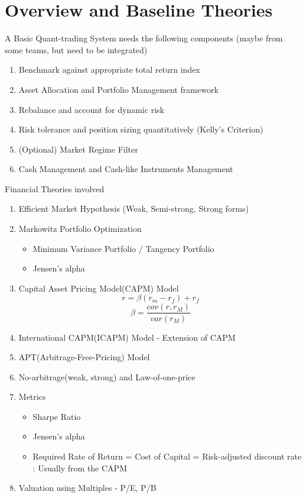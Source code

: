 \documentclass[11pt, openany]{book}              %
\begin{document}
\section{Overview and Baseline Theories}

A Basic Quant-trading System needs the following components (maybe from some teams, but need to be integrated)

\begin{enumerate}
\item Benchmark against appropriate total return index
\item Asset Allocation and Portfolio Management	framework
\item Rebalance and account for dynamic risk 
\item Risk tolerance and position sizing quantitatively (Kelly's Criterion)
\item (Optional) Market Regime Filter 
\item Cash Management and Cash-like Instruments Management
\end{enumerate}

Financial Theories involved

\begin{enumerate}
 \item Efficient Market Hypothesis (Weak, Semi-strong, Strong forms)
 \item Markowitz Portfolio Optimization
 \begin{itemize}
    \item Minimum Variance Portfolio / Tangency Portfolio 
    \item Jensen's alpha
  \end{itemize}
  \item Capital Asset Pricing Model(CAPM) Model \\
        $$ r = \beta(r_m - r_f) + r_f $$
 		$$\beta = \frac{cov(r,r_M)}{var(r_M)}$$
 	\item International CAPM(ICAPM) Model - Extension of CAPM
  \item APT(Arbitrage-Free-Pricing) Model 
 \item No-arbitrage(weak, strong) and Law-of-one-price
 \item Metrics
  \begin{itemize}
    \item Sharpe Ratio
    \item Jensen's alpha
    
        \item Required Rate of Return = Cost of Capital = Risk-adjusted discount rate : Usually from the CAPM
   \end{itemize}
 \item Valuation using Multiples - P/E, P/B 
 \end{enumerate}
 
\end{document}
